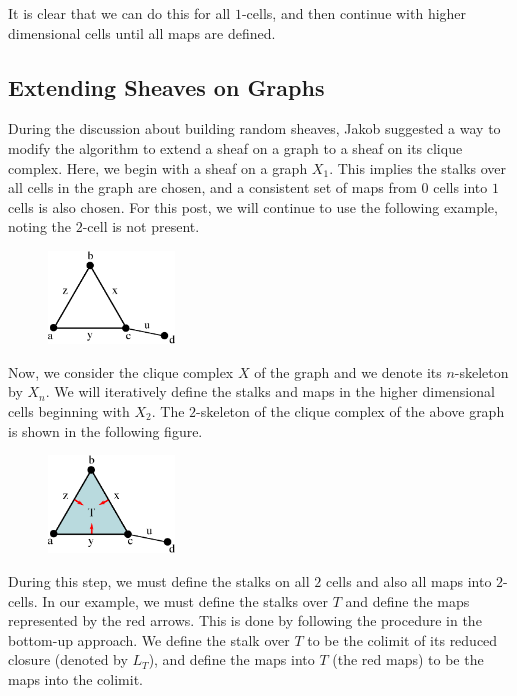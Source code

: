 \documentclass{article}
\theoremstyle{definition}
\begin{document}
It is clear that we can do this for all $1$-cells, and then continue with higher dimensional cells until all maps are defined. \\

\subsection{Extending Sheaves on Graphs}
During the discussion about building random sheaves, Jakob suggested a way to modify the algorithm to extend a sheaf on a graph to a sheaf on its clique complex. Here, we begin with a sheaf on a graph $X_1$. This implies the stalks over all cells in the graph are chosen, and a consistent set of maps from $0$ cells into $1$ cells is also chosen. For this post, we will continue to use the following example, noting the $2$-cell is not present.\\

\begin{figure}[!htbp]
\centering
	\includegraphics[width=0.3\textwidth]{images/graph.eps}
\end{figure}

Now, we consider the clique complex $X$ of the graph and we denote its $n$-skeleton by $X_n$. We will iteratively define the stalks and maps in the higher dimensional cells beginning with $X_2$. The $2$-skeleton of the clique complex of the above graph is shown in the following figure.

\begin{figure}[!htbp]
\centering
	\includegraphics[width=0.3\textwidth]{images/graph2.eps}
\end{figure}

During this step, we must define the stalks on all $2$ cells and also all maps into $2$-cells. In our example, we must define the stalks over $T$ and define the maps represented by the red arrows. This is done by following the procedure in the bottom-up approach. We define the stalk over $T$ to be the colimit of its reduced closure (denoted by $L_T$), and define the maps into $T$ (the red maps) to be the maps into the colimit.
\end{document}
